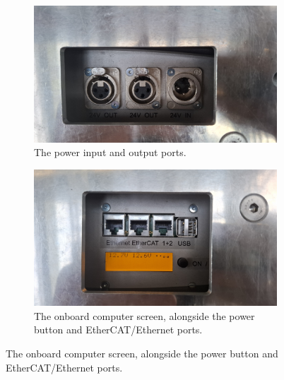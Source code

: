 \documentclass[a4paper, 12pt]{article}
\begin{document}
    \begin{figure}[ht]
        \centering

        \begin{subfigure}[t]{0.49\linewidth}
            \centering
            \includegraphics[width=\linewidth]{images/sec2/youbot_power.jpg}
            \caption{The power input and output ports.}
        \end{subfigure}
        \hfill
        \begin{subfigure}[t]{0.49\linewidth}
            \centering
            \includegraphics[width=\linewidth]{images/sec2/youbot_screen.jpg}
            \caption{The onboard computer screen, alongside the power button and EtherCAT/Ethernet ports.}
        \end{subfigure}

        \vspace{0.5em}  %


\end{figure}
\end{document}
